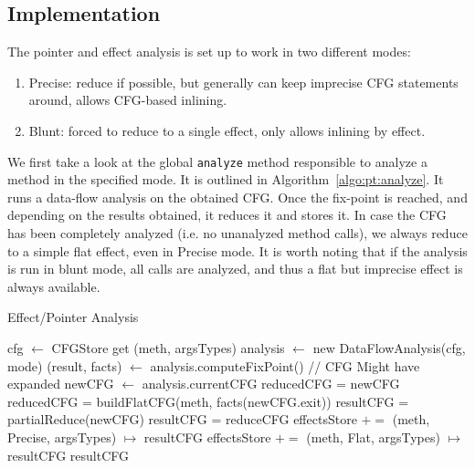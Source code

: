 \documentclass[a4paper]{article}
\begin{document}
\subsection{Implementation}
The pointer and effect analysis is set up to work in two different modes:
\begin{enumerate}
    \item Precise: reduce if possible, but generally can keep imprecise CFG
    statements around, allows CFG-based inlining.
    \item Blunt: forced to reduce to a single effect, only allows inlining by
    effect.
\end{enumerate}

We first take a look at the global \verb=analyze= method responsible to analyze
a method in the specified mode. It is outlined in
Algorithm~\ref{algo:pt:analyze}. It runs a data-flow analysis on the obtained
CFG.  Once the fix-point is reached, and depending on the results obtained, it
reduces it and stores it. In case the CFG has been completely analyzed (i.e. no
unanalyzed method calls), we always reduce to a simple flat effect, even in
Precise mode. It is worth noting that if the analysis is run in blunt mode, all
calls are analyzed, and thus a flat but imprecise effect is always available.

\begin{algorithm}
\caption{Effect/Pointer Analysis}\label{algo:pt:analyze}
\begin{algorithmic}[1]
    \State cfg $\gets$ CFGStore get (meth, argsTypes)
    \State analysis $\gets$ new DataFlowAnalysis(cfg, mode)
    \State (result, facts) $\gets$ analysis.computeFixPoint()
    \State // CFG Might have expanded
    \State newCFG $\gets$ analysis.currentCFG
        \State reducedCFG = newCFG
    \Else
        \State reducedCFG = buildFlatCFG(meth, facts(newCFG.exit))
    \EndIf
    \State
        \State resultCFG = partialReduce(newCFG)
    \Else
        \State resultCFG = reduceCFG
    \EndIf
    \State
        \State effectsStore $+=$ (meth, Precise, argsTypes) $\mapsto$ resultCFG
    \EndIf
    \State
        \State effectsStore $+=$ (meth, Flat, argsTypes) $\mapsto$ resultCFG
    \EndIf
    \State
    \State \Return resultCFG
\EndFunction
\end{algorithmic}
\end{algorithm}

\FloatBarrier
\end{document}
